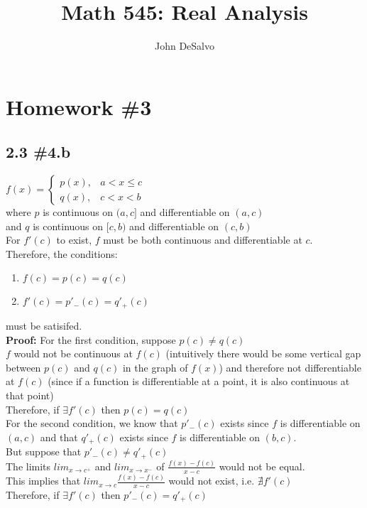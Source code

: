 \documentclass[12pt]{article}
\begin{document}
\pagestyle{plain}

\title{Math 545: Real Analysis}
\author{John DeSalvo}
\maketitle

\tableofcontents

\section{Homework \#3}
\subsection{2.3 \#4.b}
$f(x) = \begin{cases}
	p(x), & a < x \le c \\
	q(x), & c < x < b
\end{cases}$ \\
where $p$ is continuous on $(a, c]$ and differentiable on $(a, c)$ \\
and $q$ is continuous on $[c, b)$ and differentiable on $(c, b)$ \\
For $f'(c)$ to exist, $f$ must be both continuous and differentiable at $c$. \\ 
Therefore, the conditions: \begin{enumerate}
	\item $f(c) = p(c) = q(c)$
	\item $f'(c) = p'_{-}(c) = q'_{+}(c)$
\end{enumerate} must be satisifed. \\
\textbf{Proof:} For the first condition, suppose $p(c) \ne q(c)$ \\ 
$f$ would not be continuous at $f(c)$ (intuitively there would be some vertical gap between $p(c)$ and $q(c)$ in the graph of $f(x)$) and therefore not differentiable at $f(c)$ (since if a function is differentiable at a point, it is also continuous at that point) \\
Therefore, if $\exists f'(c)$ then $p(c) = q(c)$ \\
For the second condition, we know that $p'_{-}(c)$ exists since $f$ is differentiable on $(a, c)$ and that $q'_{+}(c)$ exists since $f$ is differentiable on $(b, c)$. \\
But suppose that $p'_{-}(c) \ne q'_{+}(c)$ \\
The limits $lim_{x \to c^{+}}$ and $lim_{x \to x^{-}}$ of $\frac{f(x)-f(c)}{x-c}$ would not be equal. \\
This implies that $lim_{x \to c} \frac{f(x)-f(c)}{x-c}$ would not exist, i.e. $\nexists f'(c)$ \\
Therefore, if $\exists f'(c)$ then $p'_{-}(c) = q'_{+}(c)$
\end{document}
